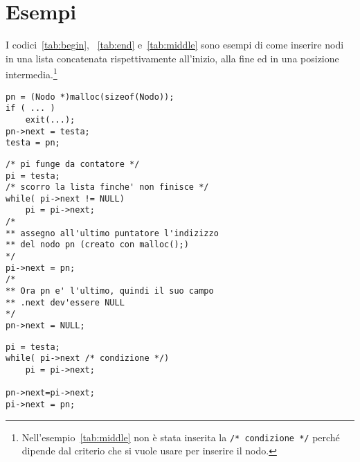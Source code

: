 	\section{Esempi}
I codici~\vref{tab:begin}, ~\vref{tab:end} e~\vref{tab:middle} sono esempi di come inserire nodi in una lista concatenata rispettivamente all'inizio, alla fine ed in una posizione intermedia.\footnote{Nell'esempio~\ref{tab:middle} non è stata inserita la \lstinline!/* condizione */! perché dipende dal criterio che si vuole usare per inserire il nodo.}
	
\begin{lstlisting}[caption={\emph{Inserimento in testa}}, label={tab:begin}]
pn = (Nodo *)malloc(sizeof(Nodo));
if ( ... )
	exit(...);
pn->next = testa;
testa = pn;
\end{lstlisting}

\begin{lstlisting}[caption={\emph{Inserimento in coda}}, label={tab:end}]
/* pi funge da contatore */
pi = testa;
/* scorro la lista finche' non finisce */
while( pi->next != NULL)
	pi = pi->next;
/*
** assegno all'ultimo puntatore l'indizizzo
** del nodo pn (creato con malloc();)
*/
pi->next = pn;
/*
** Ora pn e' l'ultimo, quindi il suo campo
** .next dev'essere NULL
*/
pn->next = NULL;
\end{lstlisting}

\begin{lstlisting}[caption={\emph{Inserimento intermedio}}, label={tab:middle}]
pi = testa;
while( pi->next /* condizione */)
	pi = pi->next;

pn->next=pi->next;
pi->next = pn;
\end{lstlisting}
	


